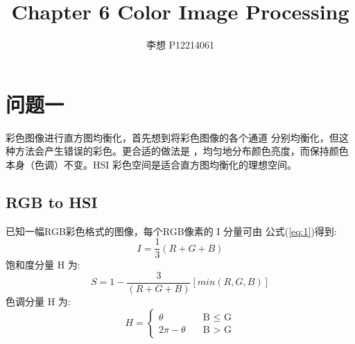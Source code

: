 \documentclass[UTF8]{article}
\title{​Chapter 6 Color Image Processing}
\author{李想 \quad P12214061}
\begin{document}
\maketitle
\section{问题一}
彩色图像进行直方图均衡化，首先想到将彩色图像的各个通道
分别均衡化，但这种方法会产生错误的彩色。更合适的做法是
，均匀地分布颜色亮度，而保持颜色本身（色调）不变。HSI
彩色空间是适合直方图均衡化的理想空间。
\subsection{RGB to HSI}
已知一幅RGB彩色格式的图像，每个RGB像素的 I 分量可由
公式(\ref{eq:1})得到:
\begin{equation}
    I = \frac{1}{3}(R + G + B)
    \label{eq:1}
\end{equation}
饱和度分量 H 为:
\begin{equation}
    S = 1 -\frac{3}{(R+G+B)}[min(R,G,B)]
    \label{eq:2}
\end{equation}
色调分量 H 为:
\begin{equation}
    H = \begin{cases}
        \theta &  \quad\text{B $\leq$ G}\\
        2\pi - \theta & \quad\text{B > G}
        \end{cases}
    \label{eq:3}
\end{equation}
\end{document}
